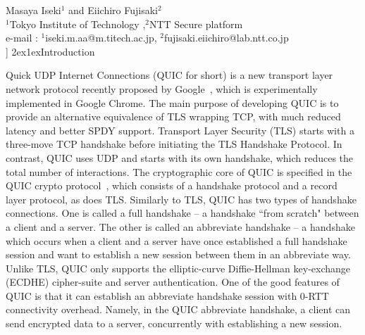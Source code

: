 \documentclass[11pt,a4j]{jarticle}
\makeatletter
\renewcommand{\baselinestretch}{1.3}\selectfont
\def\Title#1{{\Large\bf#1}\\[6pt]}
\def\Author#1{{\normalsize\hspace*{2zw}#1}\\[-4pt]}
\def\Affiliation#1{{\normalsize\hspace*{2zw}#1}\\[-5pt]}
\def\Email#1{\hspace*{2zw}e-mail : #1\\[0pt]}
\renewcommand{\section}{\@startsection{section}{1}{\z@}%
{2ex}{1ex}{\reset@font\large\bfseries}}%
\makeatother
\begin{document}
\twocolumn[
%
\Title{On the Security of QUIC}
\Author{Masaya Iseki$^{1}$ and Eiichiro Fujisaki$^{2}$}
\Affiliation{$^{1}$Tokyo Institute of Technology ,$^{2}$NTT Secure platform}
\Email{$^{1}$iseki.m.aa@m.titech.ac.jp, $^{2}$fujisaki.eiichiro@lab.ntt.co.jp}
%
]
\renewcommand{\baselinestretch}{0.95}\selectfont
%
%
\section{Introduction}

Quick UDP Internet Connections (QUIC for short)
is a new transport layer network protocol recently proposed by Google~\cite{QUIC},
which is experimentally implemented in Google Chrome.
The main purpose of developing QUIC is to provide an alternative equivalence of TLS wrapping TCP,
with much reduced latency and better SPDY support.
Transport Layer Security (TLS) starts with a three-move TCP handshake
before initiating the TLS Handshake Protocol.
In contrast, QUIC uses UDP and starts with its own handshake,
which reduces the total number of interactions.
The cryptographic core of QUIC is specified in the QUIC crypto protocol~\cite{QUIC:Crypto},
which consists of a handshake protocol and a record layer protocol,
as does TLS.
Similarly to TLS, QUIC has two types of handshake connections.
One is called a full handshake --
a handshake ``from scratch" between a client and a server.
The other is called an abbreviate handshake -- a handshake which occurs when a client and a server have once established a full handshake session
and want to establish a new session between them in an abbreviate way.
Unlike TLS,
QUIC only supports the elliptic-curve Diffie-Hellman key-exchange (ECDHE) cipher-suite and server authentication.
%
One of the good features of QUIC is that it can establish an abbreviate handshake session
with $0$-RTT connectivity overhead.
Namely, in the QUIC abbreviate handshake, a client can
send encrypted data to a server, concurrently with establishing a new session.
\end{document}
